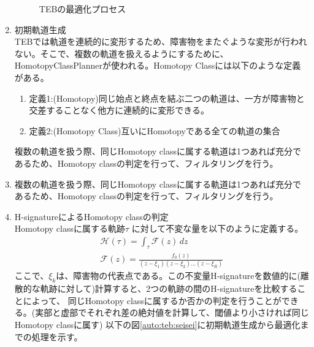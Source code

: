 \begin{enumerate}
\begin{figure}[h]
\begin{center}
    \caption{TEBの最適化プロセス}
    \label{auto:teb:opt}
  \end{center}
\end{figure}
\item 初期軌道生成\\
TEBでは軌道を連続的に変形するため、障害物をまたぐような変形が行われない。そこで、複数の軌道を扱えるようにするために、HomotopyClassPlannerが使われる。Homotopy Classには以下のような定義がある。
\begin{enumerate}
  \item 定義1:(Homotopy)同じ始点と終点を結ぶ二つの軌道は、一方が障害物と交差することなく他方に連続的に変形できる。
  \item 定義2:(Homotopy Class)互いにHomotopyである全ての軌道の集合
\end{enumerate}
複数の軌道を扱う際、同じHomotopy classに属する軌道は1つあれば充分であるため、Homotopy classの判定を行って、フィルタリングを行う。
\item 複数の軌道を扱う際、同じHomotopy classに属する軌道は1つあれば充分であるため、Homotopy classの判定を行って、フィルタリングを行う。
\item H-signatureによるHomotopy classの判定\\
Homotopy classに属する軌跡$\tau$ に対して不変な量を以下のように定義する。
\begin{align*}
  \mathcal{H}(\tau)=\int_{\tau}\mathcal{F}(z) \,dz\\
  \mathcal{F}(z)=\frac{f_0(z)}{(z-\xi_1) (z-\xi_2) \ldots (z-\xi_R)}
\end{align*}
ここで、$\xi_k$は、障害物の代表点である。この不変量H-signatureを数値的に(離散的な軌跡に対して)計算すると、2つの軌跡の間のH-signatureを比較することによって、
同じHomotopy classに属するか否かの判定を行うことができる。(実部と虚部でそれぞれ差の絶対値を計算して、閾値より小さければ同じHomotopy classに属す)
以下の図\ref{auto:teb:seisei}に初期軌道生成から最適化までの処理を示す。


\end{enumerate}
